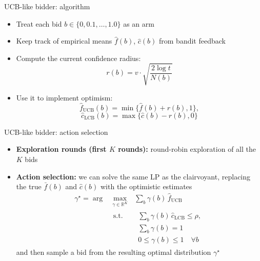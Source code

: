 \begin{frame}{UCB-like bidder: algorithm}
    \begin{itemize}
        \item Treat each bid $b \in \{0, 0.1, \dots, 1.0\}$ as an arm
        \item Keep track of empirical means $\hat{f}(b)$, $\hat{c}(b)$ from bandit feedback
        \item Compute the current confidence radius: \[r(b) = v \cdot \sqrt{\frac{2 \log t}{N(b)}}\]
        \item Use it to implement optimism: \[\hat{f}_{\mathrm{UCB}}(b) = \min\{\hat{f}(b)+r(b), 1\},\] \[\hat{c}_{\mathrm{LCB}}(b) = \max\{\hat{c}(b)-r(b), 0\}\]
    \end{itemize}
\end{frame}

\begin{frame}{UCB-like bidder: action selection}
    \begin{itemize}
        \item \textbf{Exploration rounds (first $K$ rounds):}  round-robin exploration of all the $K$ bids
        \item \textbf{Action selection:} we can solve the same LP as the clairvoyant, replacing the true $\bar{f}(b)$ and $\hat{c}(b)$ with the optimistic estimates
        \begin{equation*}
            \begin{aligned}
                \gamma^\star = \arg & \max_{\gamma \in \mathbb{R}^K} ~~~ \sum_b \gamma(b)\, \hat{f}_{\mathrm{UCB}} \\
                & \begin{aligned} 
                    \text{s.t.} ~~~~~~ & \sum_b \gamma(b)\, \hat{c}_{\mathrm{LCB}} \le \rho, \\
                    & \sum_b \gamma(b) = 1 \\
                    & 0 \le \gamma(b) \le 1\quad \forall b 
                \end{aligned}
            \end{aligned}
        \end{equation*}
        and then sample a bid from the resulting optimal distribution $\gamma^\star$
    \end{itemize}
\end{frame}

